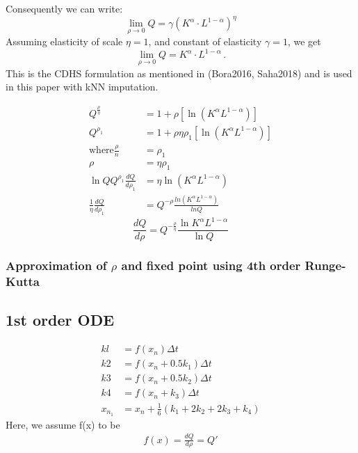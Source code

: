 \documentclass{article}
\begin{document}
Consequently we can write:
\begin{equation*} 
   \lim_{\rho\rightarrow 0}Q = \gamma (K^{\alpha} \cdot L^{1-\alpha})^{\eta} 
\end{equation*}
Assuming elasticity of scale $\eta= 1$, and  constant of elasticity $\gamma=1$, we get
\begin{equation*}
   \lim_{\rho\rightarrow 0}Q = K^{\alpha} \cdot L^{1-\alpha} \,.
\end{equation*}
This is the CDHS formulation as mentioned in (Bora2016, Saha2018) and is used in this paper with kNN imputation. 

\begin{align*}
    Q^{\frac{\rho}{\eta}}&=1+\rho[\ln{(K^\alpha L^{1-\alpha})}]\\
    Q^{\rho_1} &= 1+\rho\eta \rho_1[\ln{(K^\alpha L^{1-\alpha})}]\\
    \text{where} \frac{\rho}{n} &= \rho_1 \\
    \rho &= \eta \rho_1\\
    \ln{Q}Q^{\rho_1}\frac{dQ}{d\rho_1} &= \eta \ln{(K^\alpha L^{1-\alpha})}\\
    \frac{1}{\eta}\frac{dQ}{d\rho_1} &= Q^{-\rho} \frac{ln{(K^\alpha L^{1-\alpha})}}{ln{Q}}
    \end{align*}
\begin{equation}
    \frac{dQ}{d\rho}=Q^{-\frac{\rho}{\eta}}\frac{\ln{K^\alpha L^{1-\alpha}}}{\ln Q}
\end{equation}


\subsubsection{Approximation of $\rho$ and fixed point using 4th order Runge-Kutta}

\subsection{1st order ODE}
\begin{align*}
    kl &=f(x_n)\Delta t\\
    k2 &=f(x_n +0.5k_1)\Delta t\\
    k3 &=f(x_n+0.5k_2)\Delta t\\
    k4 &= f(x_n +k_3)\Delta t\\
    x_{n_1} &= x_n + \frac{1}{6}(k_1 + 2k_2 +2k_3+k_4)
\end{align*}
Here, we assume f(x) to be 
\begin{align*}
    f(x) = \frac{dQ}{d\rho} = Q'
\end{align*}
\end{document}
